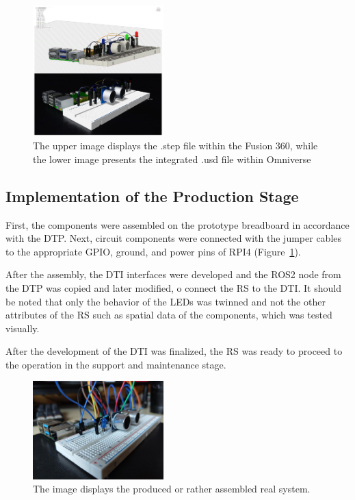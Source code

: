 \documentclass[conference]{IEEEtran}
\begin{document}
    \begin{figure}[htbp]
        \centering
        \includegraphics[width=0.45\textwidth]{Left.png}
        \caption{The upper image displays the .step file within the Fusion 360, while the lower image presents the integrated .usd file within Omniverse}\label{fig:DTP}
    \end{figure}
  

    \subsection{Implementation of the Production Stage}

    First, the components were assembled on the prototype breadboard in accordance with the DTP. Next, circuit components were connected with the jumper cables to the appropriate GPIO, ground, and power pins of RPI4 
    (Figure~\ref{fig:DTP}). 

    After the assembly, the DTI interfaces were developed and the ROS2 node from the DTP was copied and later modified, o connect the RS to the DTI. It should be noted that only 
    the behavior of the LEDs was twinned and not the other attributes 
    of the RS such as spatial data of the components, which was tested visually.

    After the development of the DTI was finalized, the RS was ready to proceed to the operation in the support and maintenance stage.

    \begin{figure}[htbp]
        \centering
        \includegraphics[width=0.45\textwidth]{Assembled.jpg}
        \caption{The image displays the produced or rather assembled real system.}\label{fig:Assembled}
    \end{figure}
\end{document}
